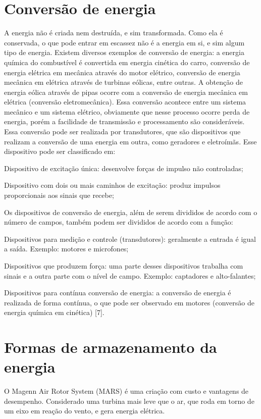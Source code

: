 \section{Conversão de energia}

A energia não é criada nem destruída, e sim transformada. Como ela é conservada, o que pode entrar em escassez não é a energia em si, e sim algum tipo de energia.
Existem diversos exemplos de conversão de energia: a energia química do combustível é convertida em energia cinética do carro, conversão de energia elétrica em mecânica através do motor elétrico, conversão de energia mecânica  em elétrica através de turbinas eólicas, entre outras.
A obtenção de energia eólica através de pipas ocorre com a conversão de energia mecânica em elétrica (conversão eletromecânica). Essa conversão acontece entre um sistema mecânico e um sistema elétrico, obviamente que nesse processo ocorre perda de energia, porém a facilidade de transmissão e processamento são consideráveis.
Essa conversão pode ser realizada por transdutores, que são dispositivos que realizam a conversão de uma energia em outra, como geradores e eletroímãs. Esse dispositivo pode ser classificado em:

Dispositivo de excitação única: desenvolve forças de impulso não controladas;

Dispositivo com dois ou mais caminhos de excitação: produz impulsos proporcionais aos sinais que recebe;

Os dispositivos de conversão de energia, além de serem divididos de acordo com o número de campos, também podem ser divididos de acordo com a função:

Dispositivos para medição e controle (transdutores): geralmente a entrada é igual a saída. Exemplo: motores e microfones;

Dispositivos que produzem força: uma parte desses dispositivos trabalha com sinais e a outra parte com o nível de campo. Exemplo: captadores e alto-falantes;

Dispositivos para contínua conversão de energia: a conversão de energia é realizada de forma contínua, o que pode ser observado em motores (conversão de energia química em cinética) [7].

\section{Formas de armazenamento da energia}

O Magenn Air Rotor System (MARS) é uma criação com custo e vantagens de desempenho. Considerado uma turbina mais leve que o ar, que roda em torno de um eixo em reação do vento, e gera energia elétrica.
 
